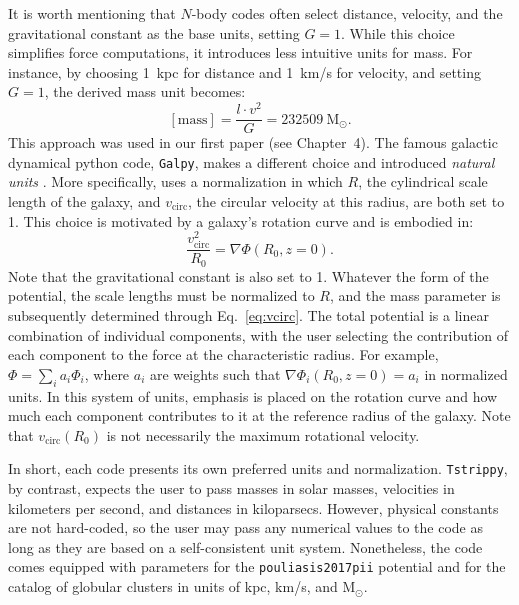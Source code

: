     It is worth mentioning that $N$-body codes often select distance, velocity, and the gravitational constant as the base units, setting $G = 1$. While this choice simplifies force computations, it introduces less intuitive units for mass. For instance, by choosing 1~kpc for distance and 1~km/s for velocity, and setting $G = 1$, the derived mass unit becomes:
    \begin{equation}
        \left[\mathrm{mass}\right] = \frac{l \cdot v^2}{G} = 232509~\mathrm{M}_\odot.
    \end{equation} This approach was used in our first paper (see Chapter~4). 
    The famous galactic dynamical python code, \texttt{Galpy}, makes a different choice and introduced \textit{natural units} \citep{2015ApJS..216...29B}. More specifically, \citet{2015ApJS..216...29B} uses a normalization in which $R$, the cylindrical scale length of the galaxy, and $v_\mathrm{circ}$, the circular velocity at this radius, are both set to 1. This choice is motivated by a galaxy's rotation curve and is embodied in:
    \begin{equation}
        \frac{v_\mathrm{circ}^2}{R_0} = \nabla  \Phi \left(R_0, z=0\right).
        \label{eq:vcirc}
    \end{equation}
    Note that the gravitational constant is also set to 1. Whatever the form of the potential, the scale lengths must be normalized to $R$, and the mass parameter is subsequently determined through Eq.~\ref{eq:vcirc}. The total potential is a linear combination of individual components, with the user selecting the contribution of each component to the force at the characteristic radius. For example, $\Phi = \sum_i a_i\Phi_i$, where $a_i$ are weights such that $\nabla \Phi_i(R_0, z=0) = a_i$ in normalized units. In this system of units, emphasis is placed on the rotation curve and how much each component contributes to it at the reference radius of the galaxy. Note that $v_\mathrm{circ}(R_0)$ is not necessarily the maximum rotational velocity.

    In short, each code presents its own preferred units and normalization. \texttt{Tstrippy}, by contrast, expects the user to pass masses in solar masses, velocities in kilometers per second, and distances in kiloparsecs. However, physical constants are not hard-coded, so the user may pass any numerical values to the code as long as they are based on a self-consistent unit system. Nonetheless, the code comes equipped with parameters for the \texttt{pouliasis2017pii} potential \citep{2017A&A...598A..66P} and for the catalog of globular clusters \citep{2018MNRAS.478.1520B} in units of kpc, km/s, and $\mathrm{M}_\odot$.

